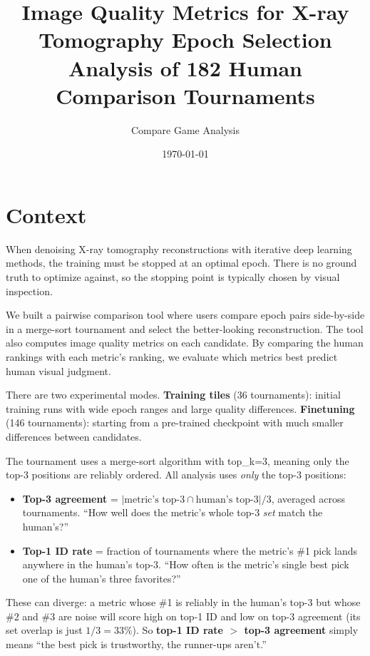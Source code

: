 \documentclass[11pt]{article}
\title{Image Quality Metrics for X-ray Tomography Epoch Selection\\[4pt]\large Analysis of 182 Human Comparison Tournaments}
\author{Compare Game Analysis}
\date{\today}
\begin{document}
\maketitle

\section{Context}

When denoising X-ray tomography reconstructions with iterative deep learning methods, the training must be stopped at an optimal epoch. There is no ground truth to optimize against, so the stopping point is typically chosen by visual inspection.

We built a pairwise comparison tool where users compare epoch pairs side-by-side in a merge-sort tournament and select the better-looking reconstruction. The tool also computes image quality metrics on each candidate. By comparing the human rankings with each metric's ranking, we evaluate which metrics best predict human visual judgment.

There are two experimental modes. \textbf{Training tiles} (36 tournaments): initial training runs with wide epoch ranges and large quality differences. \textbf{Finetuning} (146 tournaments): starting from a pre-trained checkpoint with much smaller differences between candidates.

The tournament uses a merge-sort algorithm with top\_k=3, meaning only the top-3 positions are reliably ordered. All analysis uses \emph{only} the top-3 positions:

\begin{itemize}
\item \textbf{Top-3 agreement} = $|\text{metric's top-3} \cap \text{human's top-3}| / 3$, averaged across tournaments. ``How well does the metric's whole top-3 \emph{set} match the human's?''
\item \textbf{Top-1 ID rate} = fraction of tournaments where the metric's \#1 pick lands anywhere in the human's top-3. ``How often is the metric's single best pick one of the human's three favorites?''
\end{itemize}

These can diverge: a metric whose \#1 is reliably in the human's top-3 but whose \#2 and \#3 are noise will score high on top-1 ID and low on top-3 agreement (its set overlap is just $1/3 = 33\%$). So \textbf{top-1 ID rate $>$ top-3 agreement} simply means ``the best pick is trustworthy, the runner-ups aren't.''
\end{document}
